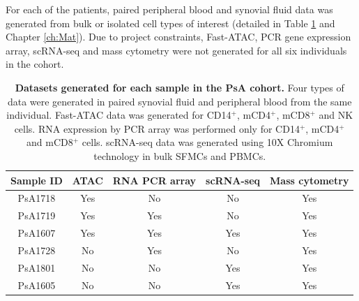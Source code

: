 For each of the patients, paired peripheral blood and synovial fluid data was generated from bulk or isolated cell types of interest (detailed in Table \ref{tab:PSA_datasets_per_sample} and Chapter \ref{ch:Mat}). Due to project constraints, Fast-ATAC, PCR gene expression array, scRNA-seq and mass cytometry were not generated for all six individuals in the cohort. 

\begin{table}[htbp]
\centering
\begin{tabular}{@{} c c c c c}
\toprule
\textbf{Sample ID} & \textbf{ATAC} & \textbf{RNA PCR array} & \textbf{scRNA-seq} & \textbf{Mass cytometry} \\
\midrule
\midrule
PsA1718 & Yes & No & No & Yes\\
PsA1719 & Yes & Yes & No & Yes\\
PsA1607 & Yes & Yes & Yes & Yes\\
PsA1728 & No & Yes & No & Yes\\
PsA1801 & No & No & Yes & Yes\\
PsA1605 & No & No & Yes & Yes\\
\bottomrule
\end{tabular}
\medskip %
\caption[Datasets generated for each sample in the PsA cohort.]{\textbf{Datasets generated for each sample in the PsA cohort.} Four types of data were generated in paired synovial fluid and peripheral blood from the same individual. Fast-ATAC data was generated for CD14$^+$, mCD4$^+$, mCD8$^+$ and NK cells. RNA expression by PCR array was performed only for CD14$^+$, mCD4$^+$ and mCD8$^+$ cells. scRNA-seq data was generated using 10X Chromium technology in bulk SFMCs and PBMCs.}
\label{tab:PSA_datasets_per_sample}
\end{table}
\bigskip %


